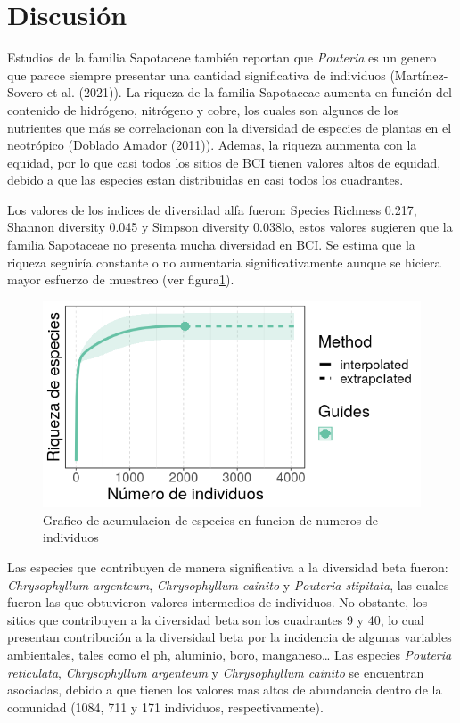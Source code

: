 \documentclass[11pt,]{article}
\begin{document}
\section{Discusión}\label{discusiuxf3n}

Estudios de la familia Sapotaceae también reportan que \emph{Pouteria}
es un genero que parece siempre presentar una cantidad significativa de
individuos (Martínez-Sovero et al. (2021)). La riqueza de la familia
Sapotaceae aumenta en función del contenido de hidrógeno, nitrógeno y
cobre, los cuales son algunos de los nutrientes que más se correlacionan
con la diversidad de especies de plantas en el neotrópico (Doblado
Amador (2011)). Ademas, la riqueza aunmenta con la equidad, por lo que
casi todos los sitios de BCI tienen valores altos de equidad, debido a
que las especies estan distribuidas en casi todos los cuadrantes.

Los valores de los indices de diversidad alfa fueron: Species Richness
0.217, Shannon diversity 0.045 y Simpson diversity 0.038lo, estos
valores sugieren que la familia Sapotaceae no presenta mucha diversidad
en BCI. Se estima que la riqueza seguiría constante o no aumentaria
significativamente aunque se hiciera mayor esfuerzo de muestreo (ver
figura\ref{fig:acumulacion_especies_individuos}).

\begin{figure}
\centering
\includegraphics{acumulacion_especies_individuos.png}
\caption{Grafico de acumulacion de especies en funcion de numeros de
individuos \label{fig:acumulacion_especies_individuos}}
\end{figure}

Las especies que contribuyen de manera significativa a la diversidad
beta fueron: \emph{Chrysophyllum argenteum}, \emph{Chrysophyllum
cainito} y \emph{Pouteria stipitata}, las cuales fueron las que
obtuvieron valores intermedios de individuos. No obstante, los sitios
que contribuyen a la diversidad beta son los cuadrantes 9 y 40, lo cual
presentan contribución a la diversidad beta por la incidencia de algunas
variables ambientales, tales como el ph, aluminio, boro,
manganeso\ldots{} Las especies \emph{Pouteria reticulata},
\emph{Chrysophyllum argenteum} y \emph{Chrysophyllum cainito} se
encuentran asociadas, debido a que tienen los valores mas altos de
abundancia dentro de la comunidad (1084, 711 y 171 individuos,
respectivamente).
\end{document}
